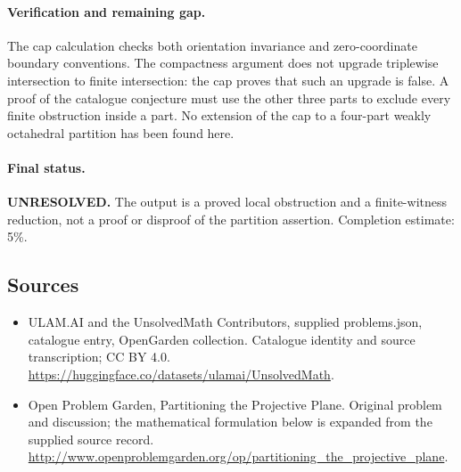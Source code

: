\documentclass[11pt,a4paper]{article}
\begin{document}
\paragraph{Verification and remaining gap.}
The cap calculation checks both orientation invariance and zero-coordinate
boundary conventions. The compactness argument does not upgrade triplewise
intersection to finite intersection: the cap proves that such an upgrade is
false. A proof of the catalogue conjecture must use the other three parts to
exclude every finite obstruction inside a part. No extension of the cap to
a four-part weakly octahedral partition has been found here.

\paragraph{Final status.}
\textbf{UNRESOLVED.} The output is a proved local obstruction and a finite-witness
reduction, not a proof or disproof of the partition assertion. Completion
estimate: 5\%.

\subsection{Sources}
\begin{itemize}
\item[S1] ULAM.AI and the UnsolvedMath Contributors, supplied problems.json, catalogue entry, OpenGarden collection. Catalogue identity and source transcription; CC BY 4.0.
\url{https://huggingface.co/datasets/ulamai/UnsolvedMath}.
\item[S2] Open Problem Garden, Partitioning the Projective Plane. Original problem and discussion; the mathematical formulation below is expanded from the supplied source record.
\url{http://www.openproblemgarden.org/op/partitioning_the_projective_plane}.

\end{itemize}
\end{document}
